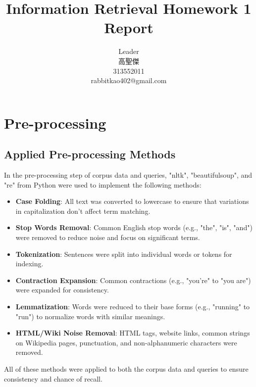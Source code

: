 \documentclass[12pt,letterpaper]{article}
\begin{document}
\begin{CJK}{UTF8}{bkai}
    \title{Information Retrieval Homework 1 Report}
    
    \author{
        Leader\\
        高聖傑\\
        313552011\\
        rabbitkao402@gmail.com
    }

    \maketitle
\end{CJK}

\section{Pre-processing}
\subsection{Applied Pre-processing Methods}
In the pre-processing step of corpus data and queries, "nltk", "beautifulsoup", and "re" from Python were used to implement the following methods:
\begin{itemize}
    \item \textbf{Case Folding}: All text was converted to lowercase to ensure that variations in capitalization don't affect term matching.
    \item \textbf{Stop Words Removal}: Common English stop words (e.g., "the", "is", "and") were removed to reduce noise and focus on significant terms.
    \item \textbf{Tokenization}: Sentences were split into individual words or tokens for indexing.
    \item \textbf{Contraction Expansion}: Common contractions (e.g., "you're" to "you are") were expanded for consistency.
    \item \textbf{Lemmatization}: Words were reduced to their base forms (e.g., "running" to "run") to normalize words with similar meanings.
    \item \textbf{HTML/Wiki Noise Removal}: HTML tags, website links, common strings on Wikipedia pages, punctuation, and non-alphanumeric characters were removed.
\end{itemize}
All of these methods were applied to both the corpus data and queries to ensure consistency and chance of recall.
\end{document}
